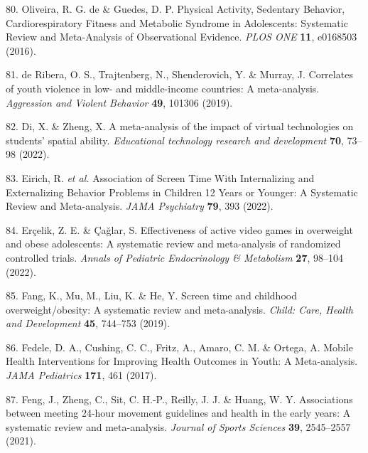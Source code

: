 \documentclass[
  english,
  man]{apa6}
\newenvironment{cslreferences}%
  {}%
  {\par}
\begin{document}
\begin{cslreferences}
\leavevmode\hypertarget{ref-oliveiraPhysicalActivitySedentary2016}{}%
80. Oliveira, R. G. de \& Guedes, D. P. Physical Activity, Sedentary Behavior, Cardiorespiratory Fitness and Metabolic Syndrome in Adolescents: Systematic Review and Meta-Analysis of Observational Evidence. \emph{PLOS ONE} \textbf{11}, e0168503 (2016).

\leavevmode\hypertarget{ref-deriberaCorrelatesYouthViolence2019}{}%
81. de Ribera, O. S., Trajtenberg, N., Shenderovich, Y. \& Murray, J. Correlates of youth violence in low- and middle-income countries: A meta-analysis. \emph{Aggression and Violent Behavior} \textbf{49}, 101306 (2019).

\leavevmode\hypertarget{ref-diMetaanalysisImpactVirtual2022}{}%
82. Di, X. \& Zheng, X. A meta-analysis of the impact of virtual technologies on students' spatial ability. \emph{Educational technology research and development} \textbf{70}, 73--98 (2022).

\leavevmode\hypertarget{ref-eirichAssociationScreenTime2022}{}%
83. Eirich, R. \emph{et al.} Association of Screen Time With Internalizing and Externalizing Behavior Problems in Children 12 Years or Younger: A Systematic Review and Meta-analysis. \emph{JAMA Psychiatry} \textbf{79}, 393 (2022).

\leavevmode\hypertarget{ref-ercelikEffectivenessActiveVideo2022}{}%
84. Erçelik, Z. E. \& Çağlar, S. Effectiveness of active video games in overweight and obese adolescents: A systematic review and meta-analysis of randomized controlled trials. \emph{Annals of Pediatric Endocrinology \& Metabolism} \textbf{27}, 98--104 (2022).

\leavevmode\hypertarget{ref-fangScreenTimeChildhood2019}{}%
85. Fang, K., Mu, M., Liu, K. \& He, Y. Screen time and childhood overweight/obesity: A systematic review and meta-analysis. \emph{Child: Care, Health and Development} \textbf{45}, 744--753 (2019).

\leavevmode\hypertarget{ref-fedeleMobileHealthInterventions2017}{}%
86. Fedele, D. A., Cushing, C. C., Fritz, A., Amaro, C. M. \& Ortega, A. Mobile Health Interventions for Improving Health Outcomes in Youth: A Meta-analysis. \emph{JAMA Pediatrics} \textbf{171}, 461 (2017).

\leavevmode\hypertarget{ref-fengAssociationsMeeting24hour2021}{}%
87. Feng, J., Zheng, C., Sit, C. H.-P., Reilly, J. J. \& Huang, W. Y. Associations between meeting 24-hour movement guidelines and health in the early years: A systematic review and meta-analysis. \emph{Journal of Sports Sciences} \textbf{39}, 2545--2557 (2021).


\end{cslreferences}
\end{document}
